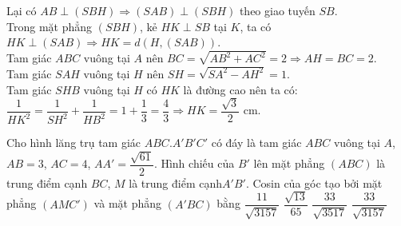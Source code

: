 \begin{ex}
{Lại có $AB\perp \left(SBH\right) \Rightarrow \left(SAB\right)\perp \left(SBH\right)$ theo giao tuyến $SB$.\\
Trong mặt phẳng $\left(SBH\right)$, kẻ $HK\perp SB$ tại $K$, ta có $HK\perp \left(SAB\right) \Rightarrow HK=d\left(H,\left(SAB\right)\right)$.\\
Tam giác $ABC$ vuông tại $A$ nên $BC=\sqrt{AB^2+AC^2}=2\Rightarrow AH=BC=2$.\\
Tam giác $SAH$ vuông tại $H$ nên $SH=\sqrt{SA^2-AH^2}=1$.\\
Tam giác $SHB$ vuông tại $H$ có $HK$ là đường cao nên ta có:\\
$\dfrac{1}{HK^2}=\dfrac{1}{SH^2}+\dfrac{1}{HB^2}=1+\dfrac{1}{3}=\dfrac{4}{3} \Rightarrow HK=\dfrac{\sqrt{3}}{2}$ cm.
}
\end{ex}

\begin{ex}%
Cho hình lăng trụ tam giác $ABC.A'B'C'$ có đáy là tam giác $ABC$ vuông tại $A$, $AB=3$, $AC=4$, $AA'=\dfrac{\sqrt{61}}{2}$. Hình chiếu của $B'$ lên mặt phẳng $\left(ABC\right)$ là trung điểm cạnh $BC$, $M$ là trung điểm cạnh$A'B'$. Cosin của góc tạo bởi mặt phẳng $\left(AMC'\right)$ và mặt phẳng $\left(A'BC\right)$ bằng
\choice
{$\dfrac{11}{\sqrt{3157}}$}
{$\dfrac{\sqrt{13}}{65}$}
{$\dfrac{33}{\sqrt{3517}}$}
{\True $\dfrac{33}{\sqrt{3157}}$}
\end{ex}

